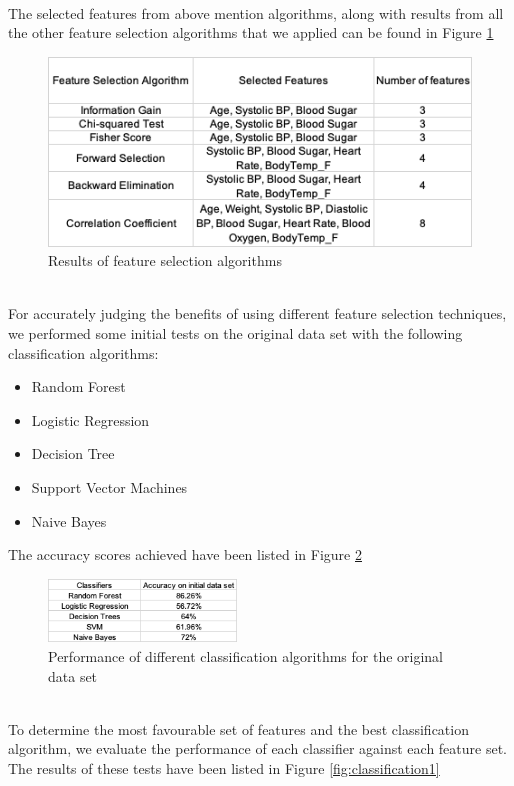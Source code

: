\documentclass[conference]{IEEEtran}
\begin{document}
\\
The selected features from above mention algorithms, along with results from all the other feature selection algorithms that we applied can be found in Figure \ref{fig:Featureresult}
\begin{figure}[!h]
    \centering
    \includegraphics[width=\columnwidth]{IMG_8566.png}
    \caption{Results of feature selection algorithms}
    \label{fig:Featureresult}
\end{figure}
\\
For accurately judging the benefits of using different feature selection techniques, we performed some initial tests on the original data set with the following classification algorithms:
\begin{itemize}
    \item Random Forest
    \item Logistic Regression
    \item Decision Tree
    \item Support Vector Machines
    \item Naive Bayes
\end{itemize}

The accuracy scores achieved have been listed in Figure \ref{fig:orig}

\begin{figure}[!h]
    \centering
    \includegraphics[width=5cm]{IMG_9611.png}
    \caption{Performance of different classification algorithms for the original data set}
    \label{fig:orig}
\end{figure}

\\To determine the most favourable set of features and the best classification algorithm, we evaluate the performance of each classifier against each feature set. The results of these tests have been listed in Figure \ref{fig:classification1}
\end{document}
